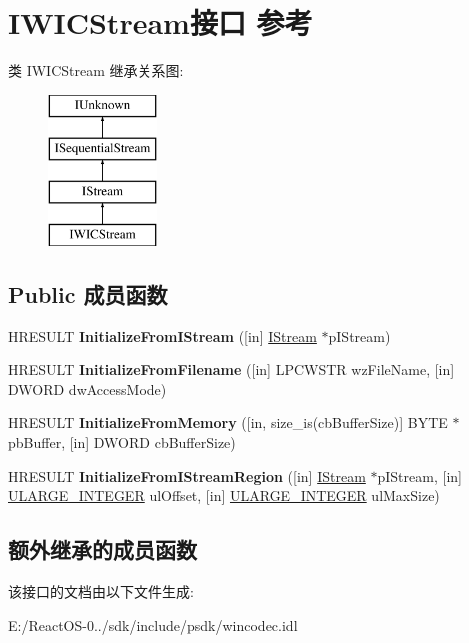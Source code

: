 \hypertarget{interface_i_w_i_c_stream}{}\section{I\+W\+I\+C\+Stream接口 参考}
\label{interface_i_w_i_c_stream}
类 I\+W\+I\+C\+Stream 继承关系图\+:\begin{figure}[H]
\begin{center}
\leavevmode
\includegraphics[height=4.000000cm]{interface_i_w_i_c_stream}
\end{center}
\end{figure}
\subsection*{Public 成员函数}
\begin{DoxyCompactItemize}
\item 
\mbox{\label{interface_i_w_i_c_stream_a123b6067cb00ed72b6a581122a28852f}} 
H\+R\+E\+S\+U\+LT {\bfseries Initialize\+From\+I\+Stream} (\mbox{[}in\mbox{]} \hyperlink{interface_i_stream}{I\+Stream} $\ast$p\+I\+Stream)
\item 
\mbox{\label{interface_i_w_i_c_stream_a37814fff421d425c52f5a6eacb5d92d2}} 
H\+R\+E\+S\+U\+LT {\bfseries Initialize\+From\+Filename} (\mbox{[}in\mbox{]} L\+P\+C\+W\+S\+TR wz\+File\+Name, \mbox{[}in\mbox{]} D\+W\+O\+RD dw\+Access\+Mode)
\item 
\mbox{\label{interface_i_w_i_c_stream_a5bc544764d7287f381de7a725120362d}} 
H\+R\+E\+S\+U\+LT {\bfseries Initialize\+From\+Memory} (\mbox{[}in, size\+\_\+is(cb\+Buffer\+Size)\mbox{]} B\+Y\+TE $\ast$pb\+Buffer, \mbox{[}in\mbox{]} D\+W\+O\+RD cb\+Buffer\+Size)
\item 
\mbox{\label{interface_i_w_i_c_stream_a71575fcbbc5152a20ce4518409fc73b7}} 
H\+R\+E\+S\+U\+LT {\bfseries Initialize\+From\+I\+Stream\+Region} (\mbox{[}in\mbox{]} \hyperlink{interface_i_stream}{I\+Stream} $\ast$p\+I\+Stream, \mbox{[}in\mbox{]} \hyperlink{struct___u_l_a_r_g_e___i_n_t_e_g_e_r}{U\+L\+A\+R\+G\+E\+\_\+\+I\+N\+T\+E\+G\+ER} ul\+Offset, \mbox{[}in\mbox{]} \hyperlink{struct___u_l_a_r_g_e___i_n_t_e_g_e_r}{U\+L\+A\+R\+G\+E\+\_\+\+I\+N\+T\+E\+G\+ER} ul\+Max\+Size)
\end{DoxyCompactItemize}
\subsection*{额外继承的成员函数}


该接口的文档由以下文件生成\+:\begin{DoxyCompactItemize}
\item 
E\+:/\+React\+O\+S-\/0../sdk/include/psdk/wincodec.\+idl\end{DoxyCompactItemize}
